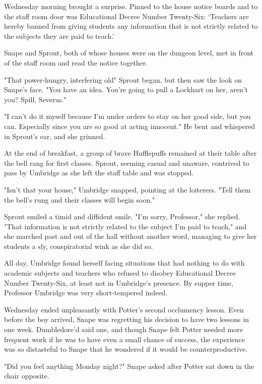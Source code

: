 Wednesday morning brought a surprise. Pinned to the house notice boards and to the staff room door was Educational Decree Number Twenty-Six: `Teachers are hereby banned from giving students any information that is not strictly related to the subjects they are paid to teach.'

Snape and Sprout, both of whose houses were on the dungeon level, met in front of the staff room and read the notice together.

"That power-hungry, interfering old{\el}" Sprout began, but then saw the look on Snape's face. "You have an idea. You're going to pull a Lockhart on her, aren't you? Spill, Severus."

"I can't do it myself because I'm under orders to stay on her good side, but you can. Especially since you are so good at acting innocent." He bent and whispered in Sprout's ear, and she grinned.

At the end of breakfast, a group of brave Hufflepuffs remained at their table after the bell rang for first classes. Sprout, seeming casual and unaware, contrived to pass by Umbridge as she left the staff table and was stopped.

"Isn't that your house," Umbridge snapped, pointing at the loiterers. "Tell them the bell's rung and their classes will begin soon."

Sprout smiled a timid and diffident smile. "I'm sorry, Professor," she replied. "That information is not strictly related to the subject I'm paid to teach," and she marched past and out of the hall without another word, managing to give her students a sly, conspiratorial wink as she did so.

All day, Umbridge found herself facing situations that had nothing to do with academic subjects and teachers who refused to disobey Educational Decree Number Twenty-Six, at least not in Umbridge's presence. By supper time, Professor Umbridge was very short-tempered indeed.

Wednesday ended unpleasantly with Potter's second occlumency lesson. Even before the boy arrived, Snape was regretting his decision to have two lessons in one week. Dumbledore'd said one, and though Snape felt Potter needed more frequent work if he was to have even a small chance of success, the experience was so distasteful to Snape that he wondered if it would be counterproductive.

"Did you feel anything Monday night?" Snape asked after Potter sat down in the chair opposite.

